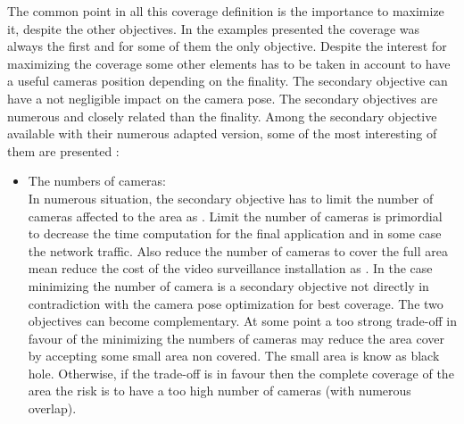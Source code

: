 The common point in all this coverage definition is the importance to maximize it, despite the other objectives. In the examples presented the coverage was always the first and for some of them the only objective. Despite the interest for maximizing the coverage some other elements has to be taken in account to have a useful cameras position depending on the finality. The secondary objective can have a not negligible impact on the camera pose.  The secondary objectives are numerous and closely related than the finality. Among the secondary objective available with their numerous adapted version, some of the most interesting of them are presented :\\
\begin{itemize}
\item  The numbers of cameras: \\ In numerous situation, the secondary objective has to limit the number of cameras affected to the area as \cite{151*zhao2013,171*horster2006,22*zhao2008}. Limit the number of cameras is primordial to decrease the time computation for the final application and in some case the network traffic. Also reduce the number of cameras to cover the full area mean reduce the cost of the video surveillance installation as \cite{82*chrysostomou2012}. In the case  minimizing the number of camera is a secondary objective not directly in contradiction with the camera pose optimization for  best coverage. The two objectives can become complementary. At some point a too strong trade-off in favour of the minimizing the numbers of cameras may reduce the area cover by accepting some small area  non covered. The small area is know as black hole. Otherwise,  if the trade-off is in favour then the complete coverage of the area the risk is to have a too high number of cameras (with numerous overlap).\\


\end{itemize}
